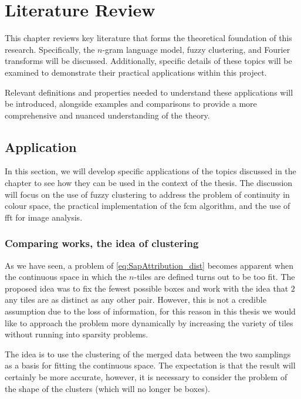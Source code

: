 \chapter{Literature Review}
\label{chap:LiteratureReview}
\begin{toReview}
This chapter reviews key literature that forms the theoretical foundation of this research. Specifically, the $n$-gram language model, fuzzy clustering, and Fourier transforms will be discussed. Additionally, specific details of these topics will be examined to demonstrate their practical applications within this project.

\noindent Relevant definitions and properties needed to understand these applications will be introduced, alongside examples and comparisons to provide a more comprehensive and nuanced understanding of the theory.




\section{Application}
In this section, we will develop specific applications of the topics discussed in the chapter to see how they can be used in the context of the thesis. The discussion will focus on the use of fuzzy clustering to address the problem of continuity in colour space, the practical implementation of the \gls{fcm} algorithm, and the use of \gls{fft} for image analysis.
\subsection{Comparing works, the idea of clustering}
As we have seen, a problem of \cref{eq:SapAttribution_dist} becomes apparent when the continuous space in which the $n$-tiles are defined turns out to be too fit. The proposed idea was to fix the fewest possible boxes and work with the idea that $2$ any tiles are as distinct as any other pair. However, this is not a credible assumption due to the loss of information, for this reason in this thesis we would like to approach the problem more dynamically by increasing the variety of tiles without running into sparsity problems.

\noindent The idea is to use the clustering of the merged data between the two samplings as a basis for fitting the continuous space. The expectation is that the result will certainly be more accurate, however, it is necessary to consider the problem of the shape of the clusters (which will no longer be boxes).


\end{toReview}
